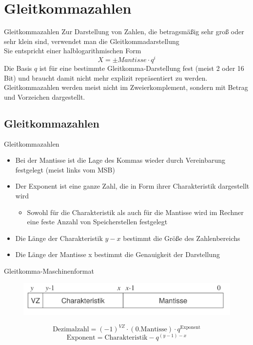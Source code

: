 \documentclass[12pt%
,aspectratio=169%
]{beamer}
\begin{document}
\section{Gleitkommazahlen}
\begin{frame}{Gleitkommazahlen}
Zur Darstellung von Zahlen, die betragsmäßig sehr groß oder sehr klein sind, verwendet man die Gleitkommadarstellung\\
Sie entspricht einer halblogarithmischen Form
$$
	X = \pm Mantisse \cdot q^{i}
$$
Die Basis $q$ ist für eine bestimmte Gleitkomma-Darstellung fest (meist 2 oder 16 Bit) und braucht damit nicht mehr explizit repräsentiert zu werden.\\
Gleitkommazahlen werden meist nicht im Zweierkomplement, sondern mit Betrag und Vorzeichen dargestellt.
\end{frame}

\subsection{Gleitkommazahlen}
\begin{frame}{Gleitkommazahlen}
\begin{itemize}
	\item Bei der Mantisse ist die Lage des Kommas wieder durch Vereinbarung festgelegt (meist links vom MSB)
	\item Der Exponent ist eine ganze Zahl, die in Form ihrer Charakteristik dargestellt wird
	\begin{itemize}
		\item Sowohl für die Charakteristik als auch für die Mantisse wird im Rechner eine feste Anzahl von Speicherstellen festgelegt
	\end{itemize}
	\item Die Länge der Charakteristik $y - x$ bestimmt die Größe des Zahlenbereichs
	\item Die Länge der Mantisse x bestimmt die Genauigkeit der Darstellung
\end{itemize}
\end{frame}

\begin{frame}{Gleitkomma-Maschinenformat}
\begin{figure}
	\center
	\includegraphics[scale=0.3]{pictures/g_maschine}
\end{figure}
$$
	\text{Dezimalzahl} = (-1)^{VZ} \cdot (0.\text{Mantisse}) \cdot q^{\text{Exponent}}
$$
$$
	\text{Exponent} = \text{Charakteristik} - q^{(y-1)-x}
$$
\end{frame}
\end{document}
